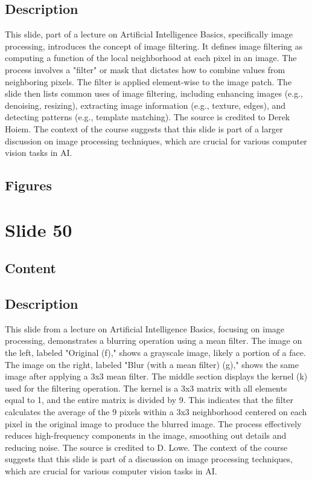 \documentclass{article}%
\begin{document}
\subsection{Description}%
This slide, part of a lecture on Artificial Intelligence Basics, specifically image processing, introduces the concept of image filtering.  It defines image filtering as computing a function of the local neighborhood at each pixel in an image.  The process involves a "filter" or mask that dictates how to combine values from neighboring pixels.  The filter is applied element-wise to the image patch.  The slide then lists common uses of image filtering, including enhancing images (e.g., denoising, resizing), extracting image information (e.g., texture, edges), and detecting patterns (e.g., template matching).  The source is credited to Derek Hoiem.  The context of the course suggests that this slide is part of a larger discussion on image processing techniques, which are crucial for various computer vision tasks in AI.%
\subsection{Figures}%
\begin{figure}[H]%
\centering%
\end{figure}

%
\newpage%
\section{Slide 50}%
\label{sec:Slide50}%
\subsection{Content}%
%
\subsection{Description}%
This slide from a lecture on Artificial Intelligence Basics, focusing on image processing, demonstrates a blurring operation using a mean filter.  The image on the left, labeled "Original (f)," shows a grayscale image, likely a portion of a face. The image on the right, labeled "Blur (with a mean filter) (g)," shows the same image after applying a 3x3 mean filter. The middle section displays the kernel (k) used for the filtering operation. The kernel is a 3x3 matrix with all elements equal to 1, and the entire matrix is divided by 9. This indicates that the filter calculates the average of the 9 pixels within a 3x3 neighborhood centered on each pixel in the original image to produce the blurred image.  The process effectively reduces high-frequency components in the image, smoothing out details and reducing noise. The source is credited to D. Lowe. The context of the course suggests that this slide is part of a discussion on image processing techniques, which are crucial for various computer vision tasks in AI.%
\end{document}
